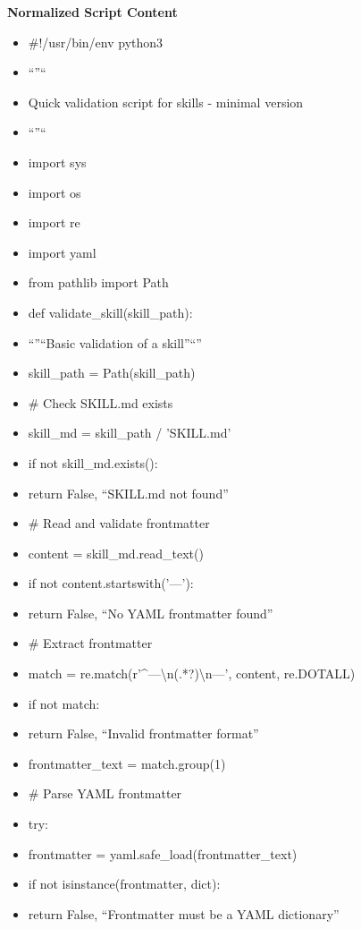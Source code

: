 \documentclass[11pt]{article}
\begin{document}
\textbf{Normalized Script Content}
\begin{itemize}[leftmargin=*,itemsep=2pt,topsep=2pt]
\item {} \#!/usr/bin/env python3
\item {} ``''``
\item {} Quick validation script for skills - minimal version
\item {} ``''``
\item {} import sys
\item {} import os
\item {} import re
\item {} import yaml
\item {} from pathlib import Path
\item {} def validate\_\allowbreak{}skill(skill\_\allowbreak{}path):
\item {} ``''``Basic validation of a skill''``''
\item {} skill\_\allowbreak{}path = Path(skill\_\allowbreak{}path)
\item {} \# Check SKILL.md exists
\item {} skill\_\allowbreak{}md = skill\_\allowbreak{}path / 'SKILL.md'
\item {} if not skill\_\allowbreak{}md.exists():
\item {} return False, ``SKILL.md not found''
\item {} \# Read and validate frontmatter
\item {} content = skill\_\allowbreak{}md.read\_\allowbreak{}text()
\item {} if not content.startswith('---'):
\item {} return False, ``No YAML frontmatter found''
\item {} \# Extract frontmatter
\item {} match = re.match(r'\textasciicircum{}---\textbackslash{}n(.*?)\textbackslash{}n---', content, re.DOTALL)
\item {} if not match:
\item {} return False, ``Invalid frontmatter format''
\item {} frontmatter\_\allowbreak{}text = match.group(1)
\item {} \# Parse YAML frontmatter
\item {} try:
\item {} frontmatter = yaml.safe\_\allowbreak{}load(frontmatter\_\allowbreak{}text)
\item {} if not isinstance(frontmatter, dict):
\item {} return False, ``Frontmatter must be a YAML dictionary''

\end{itemize}
\end{document}
